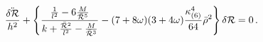\begin{equation}\label{fluc}
{{\ddot{\delta{\cal R}}}\over h^2} + \left\{ {{{1
  \over l^2} -6 {M \over {\bar{\cal R}^5}}} \over {k + {{\bar{\cal
  R}^2}\over l^2} - {M \over {\bar{\cal R}^3}}}} - (7+8\omega)
  (3+4\omega) {{\kappa_{(6)} ^4} \over {64}} \bar\rho ^2 \right\}
  \delta{\cal R} =0 \, .
\end{equation}

